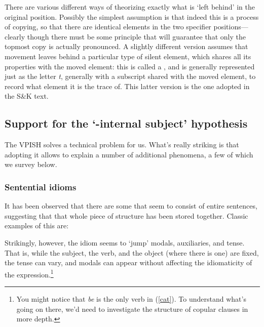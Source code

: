 \documentclass{article}
\begin{document}
There are various different ways of theorizing exactly what is `left behind' in the original position.
Possibly the simplest assumption is that indeed this is a process of copying, so that there are identical elements in the two specifier positions---clearly though there must be some principle that will guarantee that only the topmost copy is actually pronounced.
A slightly different version assumes that movement leaves behind a particular type of silent element, which shares all its properties with the moved element: this is called a , and is generally represented just as the letter \emph{t}, generally with a subscript shared with the moved element, to record what element it is the trace of.
This latter version is the one adopted in the S\&K text.

\subsection{Support for the `-internal subject' hypothesis}
The VPISH solves a technical problem for us. What's really striking is that adopting it allows to explain a number of additional phenomena, a few of which we survey below.

\subsubsection{Sentential idioms}

It has been observed that there are some  that seem to consist of entire sentences, suggesting that that whole piece of structure has been stored together. Classic examples of this are:
\begin{exe}
\end{exe}
Strikingly, however, the idiom seems to `jump' modals, auxiliaries, and tense.
That is, while the subject, the verb, and the object (where there is one) are fixed, the tense can vary, and modals can appear without affecting the idiomaticity of the expression.\footnote{You might notice that \emph{be} is the only verb in (\ref{cat}). To understand what's going on there, we'd need to investigate the structure of copular clauses in more depth.}
\end{document}
